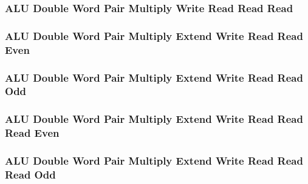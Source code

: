 \subsubsection[{\small ALU Double Word Pair Multiply Write Read Read Read}]{ALU Double Word Pair Multiply Write Read Read Read} \label{sec:format-ALU-DPMWRRR}



\subsubsection[{\small ALU Double Word Pair Multiply Extend Write Read Read Even}]{ALU Double Word Pair Multiply Extend Write Read Read Even} \label{sec:format-ALU-DPMEWRRE}



\subsubsection[{\small ALU Double Word Pair Multiply Extend Write Read Read Odd}]{ALU Double Word Pair Multiply Extend Write Read Read Odd} \label{sec:format-ALU-DPMEWRRO}



\subsubsection[{\small ALU Double Word Pair Multiply Extend Write Read Read Read Even}]{ALU Double Word Pair Multiply Extend Write Read Read Read Even} \label{sec:format-ALU-DPMEWRRRE}



\subsubsection[{\small ALU Double Word Pair Multiply Extend Write Read Read Read Odd}]{ALU Double Word Pair Multiply Extend Write Read Read Read Odd} \label{sec:format-ALU-DPMEWRRRO}




